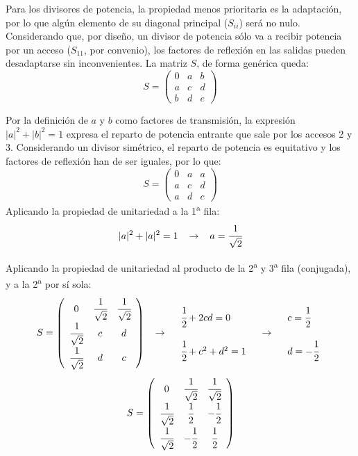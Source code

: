 \documentclass[12pt]{article}
\begin{document}
Para los divisores de potencia, la propiedad menos prioritaria es la adaptaci\'on, por lo que alg\'un elemento de su diagonal principal ($S_{ii}$) ser\'a no nulo. Considerando que, por dise\~no, un divisor de potencia s\'olo va a recibir potencia por un acceso ($S_{11}$, por convenio), los factores de reflexi\'on en las salidas pueden desadaptarse sin inconvenientes. La matriz $S$, de forma gen\'erica queda:
$$S = \left(\begin{array}{ccc}
	0 & a & b \\
	a & c & d \\
	b & d & e
\end{array}\right)$$

Por la definici\'on de $a$ y $b$ como factores de transmisi\'on, la expresi\'on $|a|^2 + |b|^2 = 1$ expresa el reparto de potencia entrante que sale por los accesos 2 y 3. Considerando un divisor sim\'etrico, el reparto de potencia es equitativo y los factores de reflexi\'on han de ser iguales, por lo que:
$$S = \left(\begin{array}{ccc}
	0 & a & a \\
	a & c & d \\
	a & d & c
\end{array}\right)$$
Aplicando la propiedad de unitariedad a la 1\textsuperscript{a} fila:
$$|a|^2 + |a|^2 = 1
\hspace{0.3cm} \rightarrow  \hspace{0.3cm}
a = \cfrac{1}{\sqrt{2}}$$

Aplicando la propiedad de unitariedad al producto de la 2\textsuperscript{a} y 3\textsuperscript{a} fila (conjugada), y a la 2\textsuperscript{a} por s\'i sola:
$$S = \left(\begin{array}{ccc}
	0 & \cfrac{1}{\sqrt{2}} & \cfrac{1}{\sqrt{2}} \\
	\cfrac{1}{\sqrt{2}} & c & d \\
	\cfrac{1}{\sqrt{2}} & d & c
\end{array}\right)
\hspace{0.3cm} \rightarrow  \hspace{0.3cm}
\begin{array}{l}
	\cfrac{1}{2} + 2cd = 0 \\
	\\
	\cfrac{1}{2} + c^2 +d^2 = 1
\end{array}
\hspace{0.3cm} \rightarrow  \hspace{0.3cm}
\begin{array}{l}
	c = \cfrac{1}{2} \\
	\\
	d = -\cfrac{1}{2}
\end{array}$$
$$S = \left(\begin{array}{ccc}
	0                   & \cfrac{1}{\sqrt{2}} & \cfrac{1}{\sqrt{2}} \\
	\cfrac{1}{\sqrt{2}} &  \cfrac{1}{2} & -\cfrac{1}{2} \\
	\cfrac{1}{\sqrt{2}} & -\cfrac{1}{2} &  \cfrac{1}{2}
\end{array}\right)$$
\end{document}
